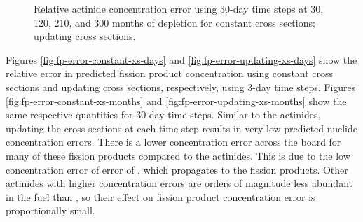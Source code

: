     \begin{figure}[h!tpb]
        \centering
        \caption[]{Relative actinide concentration error using 30-day time steps
            at 30,
                120, 210, and 300 months of depletion for
             constant cross
            sections;
             updating cross
            sections.}
    \end{figure}

    Figures \ref{fig:fp-error-constant-xs-days} and
    \ref{fig:fp-error-updating-xs-days} show the relative error in predicted
    fission product concentration using constant cross sections and updating
    cross sections, respectively, using 3-day time steps. Figures
    \ref{fig:fp-error-constant-xs-months} and
    \ref{fig:fp-error-updating-xs-months} show the same respective quantities
    for 30-day time steps. Similar to the actinides, updating the cross sections
    at each time step results in very low predicted nuclide concentration
    errors.  There is a lower concentration error across the board for
    many of these fission products compared to the actinides. This is due to the
    low concentration error of error of , which propagates to the
    fission products. Other actinides with higher concentration errors are
    orders of magnitude less abundant in the fuel than , so their
    effect on fission product concentration error is proportionally small.

